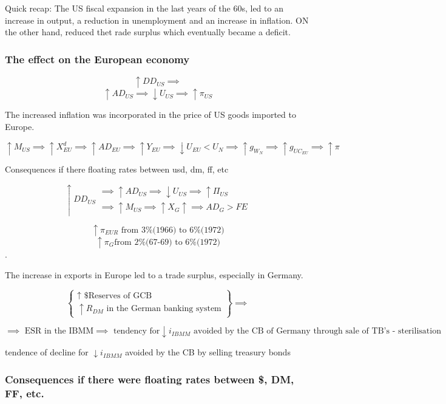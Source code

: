 \documentclass{report}
\begin{document}
Quick recap:
The US fiscal expansion in the last years of the 60s, led to an increase in output, a reduction in unemployment and an increase in inflation. ON the other hand, reduced thet rade surplus which eventually became a deficit.  

\subsubsection{The effect on the European economy}
$$\uparrow DD_{US} \implies$$
$$\uparrow AD_{US} \implies \downarrow U_{US} \implies \uparrow \pi_{US}$$

The increased inflation was incorporated in  the price of US goods imported to Europe. 

$$\uparrow M_{US} \implies \uparrow X^d_{EU} \implies \uparrow AD_{EU} \implies \uparrow Y_{EU} \implies \downarrow U_{EU} < U_N \implies \uparrow g_{W_N} \implies \uparrow g_{UC_{EU}} \implies \uparrow \pi$$

Consequences if there floating rates between usd, dm, ff, etc

$$\uparrow DD_{US}\begin{array}{l}\implies \uparrow AD_{US} \implies \downarrow U_{US} \implies \uparrow \Pi_{US} \\ \implies \uparrow M_{US} \implies \uparrow X_{G} \uparrow \implies AD_{G} > FE\end{array}$$

$$\uparrow \pi_{EUR} \text{ from 3\%(1966) to 6\%(1972)}$$
$$\uparrow \pi_{G} \text{from 2\%(67-69) to 6\%(1972)}$$
. 

The increase in exports in Europe led to a trade surplus, especially in Germany. 

$$\left\{\begin{array}{l}
     \uparrow \text{ \$ Reserves of GCB} \\
     \uparrow R_{DM} \text{ in the German banking system}
\end{array} \right\} \implies$$

$$ \implies \text{ ESR in the IBMM} \implies \text{ tendency for} \downarrow i_{IBMM} \text{ avoided by the CB of Germany through sale of TB's - sterilisation}$$

tendence of decline for $\downarrow i_{IBMM}$ avoided by the CB by selling treasury bonds


\subsubsection{Consequences if there were floating rates between \$, DM, FF, etc.}
\end{document}
